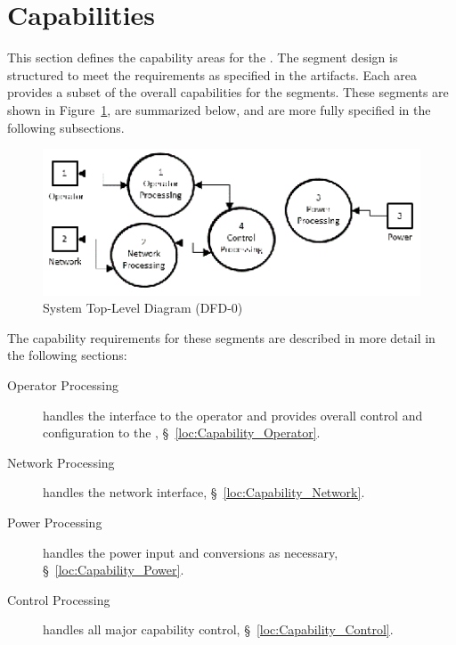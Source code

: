 \KNEADSECTIONNEWPAGE
\section{Capabilities}
\label{lab:sec_Capabilities}



This section defines the capability areas for the \ThisSys.
The segment design is structured to meet the requirements as specified in the \TBD artifacts.
Each area provides a subset of the overall capabilities for the \ThisSys segments.
These segments are shown in Figure~\ref{fig:DFD-0}, are summarized below, and are more fully specified in the following subsections.
\begin{figure}[htbp]
	\centering
		\includegraphics[width=6.5in]{../zProjectWideData/images/DFD-0_300dpi_6.5inchesWide.eps}
	\caption[System Top-Level Diagram]{System Top-Level Diagram (DFD-0)}
	\label{fig:DFD-0}
\end{figure}
 
The capability requirements for these segments are described in more detail in the following sections:
\begin{description}
	\item[Operator Processing] handles the \HMI interface to the operator and provides overall control and configuration to the \ThisSys, \S~\ref{loc:Capability_Operator}.
	\item[Network Processing] handles the network interface, \S~\ref{loc:Capability_Network}.
	\item[Power Processing] handles the power input and conversions as necessary, \S~\ref{loc:Capability_Power}.
	\item[Control Processing] handles all major capability control, \S~\ref{loc:Capability_Control}.
\end{description}

\newpage

